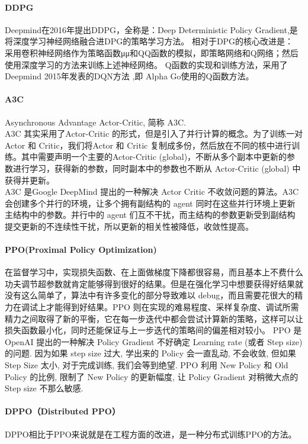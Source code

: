 \paragraph{DDPG}
Deepmind在2016年提出DDPG，全称是：Deep Deterministic Policy Gradient,是将深度学习神经网络融合进DPG的策略学习方法。 
相对于DPG的核心改进是： 采用卷积神经网络作为策略函数μμ和QQ函数的模拟，即策略网络和Q网络；然后使用深度学习的方法来训练上述神经网络。
Q函数的实现和训练方法，采用了Deepmind 2015年发表的DQN方法 ,即 Alpha Go使用的Q函数方法。
\paragraph{A3C}
Asynchronous Advantage Actor-Critic, 简称 A3C.
\\
A3C 其实采用了Actor-Critic 的形式，但是引入了并行计算的概念。为了训练一对Actor 和 Critic，我们将Actor 和 Critic 复制成多份，然后放在不同的核中进行训练。其中需要声明一个主要的Actor-Critic (global)，不断从多个副本中更新的参数进行学习，获得新的参数，同时副本中的参数也不断从 Actor-Critic (global) 中获得并更新。
\\
A3C 是Google DeepMind 提出的一种解决 Actor Critic 不收敛问题的算法。A3C会创建多个并行的环境，让多个拥有副结构的 agent 同时在这些并行环境上更新主结构中的参数。并行中的 agent 们互不干扰，而主结构的参数更新受到副结构提交更新的不连续性干扰，所以更新的相关性被降低，收敛性提高。
\paragraph{PPO(Proximal Policy Optimization)}
在监督学习中，实现损失函数、在上面做梯度下降都很容易，而且基本上不费什么功夫调节超参数就肯定能够得到很好的结果。但是在强化学习中想要获得好结果就没有这么简单了，算法中有许多变化的部分导致难以 debug，而且需要花很大的精力在调试上才能得到好结果。PPO 则在实现的难易程度、采样复杂度、调试所需精力之间取得了新的平衡，它在每一步迭代中都会尝试计算新的策略，这样可以让损失函数最小化，同时还能保证与上一步迭代的策略间的偏差相对较小。
PPO 是OpenAI 提出的一种解决 Policy Gradient 不好确定 Learning rate (或者 Step size) 的问题. 因为如果 step size 过大, 学出来的 Policy 会一直乱动, 不会收敛, 但如果 Step Size 太小, 对于完成训练, 我们会等到绝望. PPO 利用 New Policy 和 Old Policy 的比例, 限制了 New Policy 的更新幅度, 让 Policy Gradient 对稍微大点的 Step size 不那么敏感.
\paragraph{DPPO（Distributed PPO）}
DPPO相比于PPO来说就是在工程方面的改进，是一种分布式训练PPO的方法。
